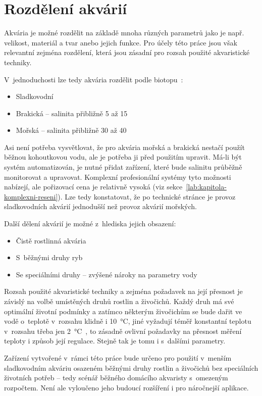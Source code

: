 \section{Rozdělení akvárií}
Akvária je možné rozdělit na základě mnoha různých parametrů jako je např. velikost, materiál a tvar anebo jejich funkce. Pro účely této práce jsou však relevantní zejména rozdělení, která jsou zásadní pro rozsah použité akvaristické techniky. 

V~jednoduchosti lze tedy akvária rozdělit podle biotopu~\cite{haskova_bakalarska2011}:
\begin{itemize}
    \item Sladkovodní
    \item Brakická -- salinita přibližně 5 až \qty{15}{\permille}
    \item Mořská -- salinita přibližně 30 až \qty{40}{\permille}
\end{itemize}

Asi není potřeba vysvětlovat, že pro akvária mořská a brakická nestačí použít běžnou kohoutkovou vodu, ale je potřeba ji před použitím upravit. Má-li být systém automatizován, je nutné přidat zařízení, které bude salinitu průběžně monitorovat a upravovat. Komplexní profesionální systémy tyto možnosti nabízejí, ale pořizovací cena je relativně vysoká (viz sekce~\ref{lab:kapitola-komplexni-reseni}). Lze tedy konstatovat, že po technické stránce je provoz sladkovodních akvárií jednodušší než provoz akvárií mořských. 

Další dělení akvárií je možné z~hlediska jejich obsazení:
\begin{itemize}
    \item Čistě rostlinná akvária
    \item S~běžnými druhy ryb
    \item Se speciálními druhy -- zvýšené nároky na parametry vody
\end{itemize}
Rozsah použité akvaristické techniky a zejména požadavek na její přesnost je závislý na volbě umístěných druhů rostlin a živočichů. Každý druh má své optimální životní podmínky a zatímco některým živočichům se bude dařit ve vodě o~teplotě v~rozsahu klidně i \qty{10}{\degreeCelsius}, jiné vyžadují téměř konstantní teplotu v~rozsahu třeba jen \qty{2}{\degreeCelsius}~\cite{MusilLibor2018Isps}, to zásadně ovlivní požadavky na přesnost měření teploty i způsob její regulace. Stejně tak je tomu i s~dalšími parametry.

Zařízení vytvořené v~rámci této práce bude určeno pro použití v~menším sladkovodním akváriu osazeném běžnými druhy rostlin a živočichů bez speciálních životních potřeb -- tedy scénář běžného domácího akvaristy s~omezeným rozpočtem. Není ale vyloučeno jeho budoucí rozšíření i pro náročnejší aplikace.